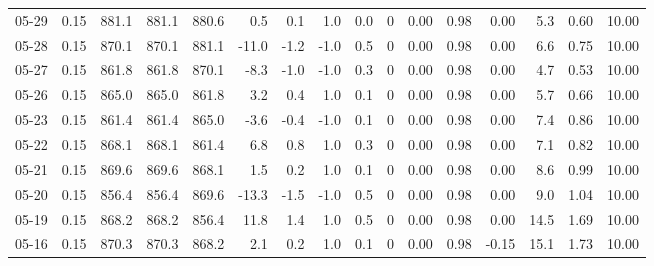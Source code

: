 \begin{threeparttable}
{\begin{tabular}{lrrrrrrrrrrrrrrr}
  05-29 &     0.15 & 881.1 & 881.1 & 880.6 &        0.5 &            0.1 &                      1.0 &                 0.0 &              0 &       0.00 &      0.98 &           0.00 &              5.3 &            0.60 &                  10.00 \\
  05-28 &     0.15 & 870.1 & 870.1 & 881.1 &      -11.0 &           -1.2 &                     -1.0 &                 0.5 &              0 &       0.00 &      0.98 &           0.00 &              6.6 &            0.75 &                  10.00 \\
  05-27 &     0.15 & 861.8 & 861.8 & 870.1 &       -8.3 &           -1.0 &                     -1.0 &                 0.3 &              0 &       0.00 &      0.98 &           0.00 &              4.7 &            0.53 &                  10.00 \\
  05-26 &     0.15 & 865.0 & 865.0 & 861.8 &        3.2 &            0.4 &                      1.0 &                 0.1 &              0 &       0.00 &      0.98 &           0.00 &              5.7 &            0.66 &                  10.00 \\
  05-23 &     0.15 & 861.4 & 861.4 & 865.0 &       -3.6 &           -0.4 &                     -1.0 &                 0.1 &              0 &       0.00 &      0.98 &           0.00 &              7.4 &            0.86 &                  10.00 \\
  05-22 &     0.15 & 868.1 & 868.1 & 861.4 &        6.8 &            0.8 &                      1.0 &                 0.3 &              0 &       0.00 &      0.98 &           0.00 &              7.1 &            0.82 &                  10.00 \\
  05-21 &     0.15 & 869.6 & 869.6 & 868.1 &        1.5 &            0.2 &                      1.0 &                 0.1 &              0 &       0.00 &      0.98 &           0.00 &              8.6 &            0.99 &                  10.00 \\
  05-20 &     0.15 & 856.4 & 856.4 & 869.6 &      -13.3 &           -1.5 &                     -1.0 &                 0.5 &              0 &       0.00 &      0.98 &           0.00 &              9.0 &            1.04 &                  10.00 \\
  05-19 &     0.15 & 868.2 & 868.2 & 856.4 &       11.8 &            1.4 &                      1.0 &                 0.5 &              0 &       0.00 &      0.98 &           0.00 &             14.5 &            1.69 &                  10.00 \\
  05-16 &     0.15 & 870.3 & 870.3 & 868.2 &        2.1 &            0.2 &                      1.0 &                 0.1 &              0 &       0.00 &      0.98 &          -0.15 &             15.1 &            1.73 &                  10.00 \\

\end{tabular}}
\end{threeparttable}
